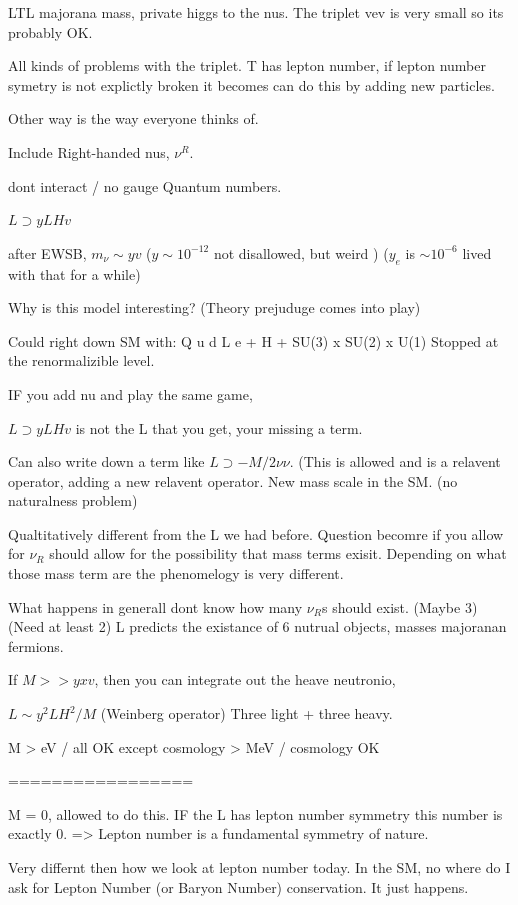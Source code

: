{LTL majorana mass,  private higgs to the nus. 
The triplet vev is very small so its probably OK. 

All kinds of problems with the triplet. 
T has lepton number, if lepton number symetry is not explictly broken it becomes can do this by adding new particles. 


Other way is the way everyone thinks of. 

Include Right-handed nus,   $\nu^R$. 

dont interact / no gauge Quantum numbers. 

$L \supset  y LHv $

after EWSB, 
  $m_\nu  \sim y v$    ($y \sim10^{-12}$ not disallowed,  but weird )
  ($y_e$ is $\sim10^{-6}$ lived with that for a while)

Why is this model interesting? 
(Theory prejuduge comes into play)

Could right down SM with: 
Q u d L e  + H + SU(3) x SU(2) x U(1)
Stopped at the renormalizible level. 

IF you add nu and play the same game, 

$L \supset  y LHv$  is not the L that you get,  your missing a term. 

Can also write down a term like $L \supset - M/2 \nu \nu$. 
(This is allowed and is a relavent operator, adding a new relavent operator.  
  New mass scale in the SM. (no naturalness problem) 

Qualtitatively different from the L we had before. 
Question becomre if you allow for $\nu_R$ should allow for the possibility that mass terms exisit. 
Depending on what those mass term are the phenomelogy is very different. 

What happens in generall dont know how many $\nu_R$s should exist. (Maybe 3) 
(Need at least 2) 
L predicts the existance of 6 nutrual objects, masses majoranan fermions.

If $M >> yxv$, then you can integrate out the heave neutronio,

$L \sim y^2 LH^2 / M$  (Weinberg operator) 
Three light + three heavy. 

M > eV / all OK except cosmology 
  > MeV / cosmology OK

=================

M = 0, allowed to do this. 
IF the L has lepton number symmetry this number is exactly 0. 
 => Lepton number is a fundamental symmetry of nature. 

Very differnt then how we look at lepton number today. 
In the SM, no where do I ask for Lepton Number (or Baryon Number) conservation. 
It just happens. 


  

}



